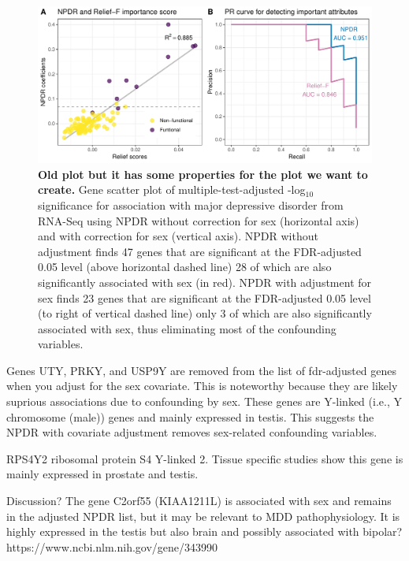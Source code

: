 \documentclass[10pt]{article}
\begin{document}
\begin{figure}[!tpb]%
\centerline{\includegraphics[scale = 1.3]{../figs/npdr_relief_cc.pdf}}
\caption{
{\bf Old plot but it has some properties for the plot we want to create.} Gene scatter plot of multiple-test-adjusted -log$_{10}$ significance for association with major depressive disorder from RNA-Seq using NPDR without correction for sex (horizontal axis) and with correction for sex (vertical axis). NPDR without adjustment finds 47 genes that are significant at the FDR-adjusted 0.05 level (above horizontal dashed line) 28 of which are also significantly associated with sex (in red).  NPDR with adjustment for sex finds 23 genes that are significant at the FDR-adjusted 0.05 level (to right of vertical dashed line) only 3 of which are also significantly associated with sex, thus eliminating most of the confounding variables.}
\label{fig:real:stir:t}
\end{figure}

Genes UTY, PRKY, and USP9Y are removed from the list of fdr-adjusted genes when you adjust for the sex covariate. This is noteworthy because they are likely suprious associations due to confounding by sex. These genes are Y-linked (i.e., Y chromosome (male)) genes and mainly expressed in testis. This suggests the NPDR with covariate adjustment removes sex-related confounding variables. 

RPS4Y2 ribosomal protein S4 Y-linked 2. Tissue specific studies show this gene is mainly expressed in prostate and testis. 

Discussion? The gene C2orf55 (KIAA1211L) is associated with sex and remains in the adjusted NPDR list, but it may be relevant to MDD pathophysiology. It is highly expressed in the testis but also brain and possibly associated with bipolar? https://www.ncbi.nlm.nih.gov/gene/343990
\end{document}
